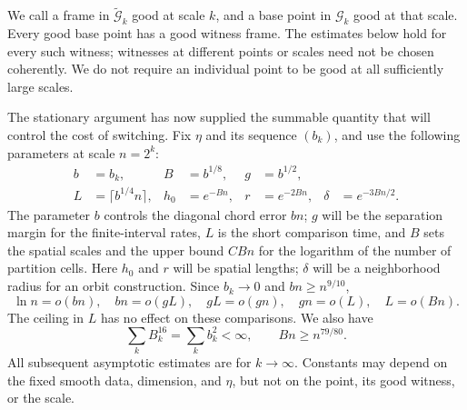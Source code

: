 We call a frame in $\widetilde{\mathcal G}_k$ good at scale $k$,
and a base point in $\mathcal G_k$ good at that scale.
Every good base point has a good witness frame.  The estimates below
hold for every such witness; witnesses at different points or scales
need not be chosen coherently.  We do not require an individual point
to be good at all sufficiently large scales.

The stationary argument has now supplied the summable quantity that
will control the cost of switching.  Fix $\eta$ and its sequence
$(b_k)$, and use the following parameters at scale $n=2^k$:
\begin{equation}\label{eq:smooth-scales}
 \begin{aligned}
 b&=b_k,& B&=b^{1/8},& g&=b^{1/2},\\
 L&=\lceil b^{1/4}n\rceil,&
 h_0&=e^{-Bn},&r&=e^{-2Bn},&\delta&=e^{-3Bn/2}.
 \end{aligned}
\end{equation}
The parameter $b$ controls the diagonal chord error $bn$;
$g$ will be the separation margin for the finite-interval rates,
$L$ is the short comparison time, and $B$ sets the spatial scales
and the upper bound $CBn$ for the logarithm of the number of
partition cells. Here $h_0$ and $r$ will be spatial lengths; $\delta$ will be a
neighborhood radius for an orbit construction.
Since $b_k\to0$ and $bn\geq n^{9/10}$,
\begin{equation}\label{eq:smooth-hierarchy}
 \ln n=o(bn),\quad bn=o(gL),\quad gL=o(gn),\quad
 gn=o(L),\quad L=o(Bn).
\end{equation}
The ceiling in $L$ has no effect on these comparisons.
We also have
\[
 \sum_k B_k^{16}=\sum_k b_k^2<\infty,
 \qquad Bn\geq n^{79/80}.
\]
All subsequent asymptotic estimates are for $k\to\infty$.
Constants may depend on the fixed smooth data, dimension, and $\eta$,
but not on the point, its good witness, or the scale.
